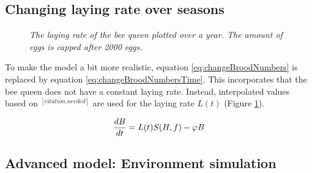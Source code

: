 	\subsection{Changing laying rate over seasons}
		\begin{figure}
			\centering
			\caption{\textit{The laying rate of the bee queen plotted over a year. The amount of eggs is capped after 2000 eggs.}}
			\label{fig:dynLayingRate}
		\end{figure}
		
		
		To make the model a bit more realistic, equation \ref{eq:changeBroodNumbers} is replaced by equation \ref{eq:changeBroodNumbersTime}. This incorporates that the bee queen does not have a constant laying rate. Instead, interpolated values based on $^{[citation.needed]}$ are used for the laying rate $L(t)$ (Figure \ref{fig:dynLayingRate}).
		
		\begin{equation}\label{eq:changeBroodNumbersTime}
			{dB \over dt} = L(t)S(H,f)-\phi B
		\end{equation}
		

	
	
	\subsection{Advanced model: Environment simulation}
	
